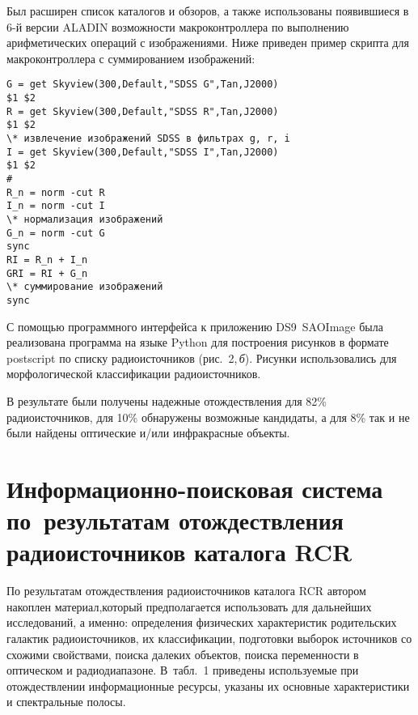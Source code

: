 \begin{multicols}{2}
      Был расширен список каталогов и обзоров, а также использованы появившиеся в 6-й 
версии \mbox{ALADIN} возможности макроконтроллера по выполнению арифметических 
операций с изображениями. Ниже приведен пример скрипта для макроконтроллера с 
суммированием изображений:



{\noindent
\small
      \begin{verbatim}
G = get Skyview(300,Default,"SDSS G",Tan,J2000)
$1 $2 
R = get Skyview(300,Default,"SDSS R",Tan,J2000) 
$1 $2 
\* извлечение изображений SDSS в фильтрах g, r, i 
I = get Skyview(300,Default,"SDSS I",Tan,J2000) 
$1 $2 
#
R_n = norm -cut R 
I_n = norm -cut I                                     
\* нормализация изображений
G_n = norm -cut G
sync 
RI = R_n + I_n 
GRI = RI + G_n                                        
\* суммирование изображений 
sync
\end{verbatim}

}



С помощью программного интерфейса к приложению DS9\ SAOImage была реализована 
программа на языке Python для построения рисунков в формате postscript по списку 
радиоисточников (рис.~2,\,\textit{б}). Рисунки использовались для морфологической 
классификации радиоисточников.



В результате были получены надежные отождествления для 82\% радиоисточников, для 10\% 
обнаружены возможные кандидаты, а для 8\% так и не были найдены оптические и/или 
инфракрасные объекты.

\section{Информационно-поисковая система по~результатам отождествления 
радиоисточников каталога RCR}

      По результатам отождествления радиоисточников каталога RCR автором накоплен 
материал,\linebreak который предполагается использовать для даль\-нейших исследований, а именно: 
определения физических характеристик родительских галактик радиоисточников, их 
классификации, подготовки\linebreak
 выборок источников со схожими свойствами, поиска далеких 
объектов, поиска переменности в оптическом и радиодиапазоне. В~табл.~1 приведены 
используемые при отождествлении информационные ресурсы, указаны их основные 
характеристики и спектральные полосы. 



\end{multicols}
